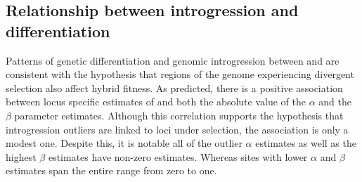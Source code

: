 






\subsection{Relationship between introgression and differentiation}
Patterns of genetic differentiation and genomic introgression between
\amer and \terr are consistent with the hypothesis that regions of the genome
experiencing divergent selection also affect hybrid fitness.
As predicted, there is a positive association between locus specific estimates
of \fst and both the absolute value of the $\alpha$ and the $\beta$ parameter 
estimates.
Although this correlation supports the hypothesis that introgression outliers 
are linked to loci under selection, the association is only a modest one. 
Despite this, it is notable all of the outlier $\alpha$ estimates as well as the
highest $\beta$ estimates have non-zero \fst estimates. 
Whereas sites with lower $\alpha$ and $\beta$ estimates span the entire range 
from zero to one. 


